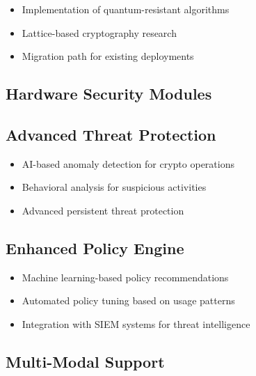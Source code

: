 \documentclass[12pt]{article}
\begin{document}
\begin{itemize}
    \item Implementation of quantum-resistant algorithms
    \item Lattice-based cryptography research
    \item Migration path for existing deployments
\end{itemize}

\subsection{Hardware Security Modules}


\subsection{Advanced Threat Protection}

\begin{itemize}
    \item AI-based anomaly detection for crypto operations
    \item Behavioral analysis for suspicious activities
    \item Advanced persistent threat protection
\end{itemize}

\subsection{Enhanced Policy Engine}

\begin{itemize}
    \item Machine learning-based policy recommendations
    \item Automated policy tuning based on usage patterns
    \item Integration with SIEM systems for threat intelligence
\end{itemize}

\subsection{Multi-Modal Support}
\end{document}
